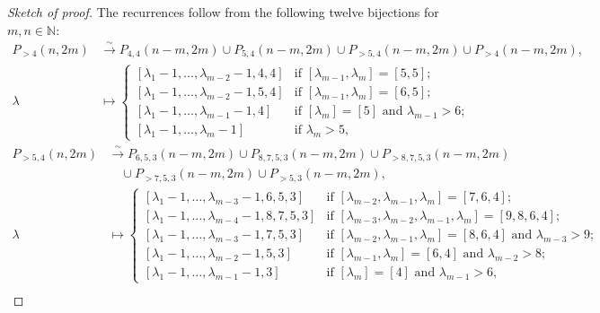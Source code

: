 \documentclass[a4paper, 12pt, reqno]{amsart}
\theoremstyle{remark}
\numberwithin{equation}{subsection}
\begin{document}
\begin{proof}[Sketch of proof]
  The recurrences follow from the following twelve bijections for $m, n \in \mathbb{N}$:
  \begin{align*}
    P_{>4}(n, 2m) &\xrightarrow{\sim} P_{4, 4}(n - m, 2m) \cup P_{5, 4}(n - m, 2m) \cup P_{>5, 4}(n - m, 2m) \cup P_{>4}(n - m, 2m), \\
    \lambda &\mapsto
              \begin{cases}
                [\lambda_1 - 1, \dots, \lambda_{m - 2} - 1, 4, 4] &\text{if }[\lambda_{m - 1}, \lambda_m] = [5, 5]; \\
                [\lambda_1 - 1, \dots, \lambda_{m - 2} - 1, 5, 4] &\text{if }[\lambda_{m - 1}, \lambda_m] = [6, 5]; \\
                [\lambda_1 - 1, \dots, \lambda_{m - 1} - 1, 4] &\text{if }[\lambda_m] = [5]\text{ and }\lambda_{m - 1} > 6; \\
                [\lambda_1 - 1, \dots, \lambda_m - 1] &\text{if }\lambda_m > 5,
              \end{cases}
  \end{align*}
  \begin{align*}
    P_{>5, 4}(n, 2m) &\xrightarrow{\sim} P_{6, 5, 3}(n - m, 2m) \cup P_{8, 7, 5, 3}(n - m, 2m) \cup P_{>8, 7, 5, 3}(n - m, 2m) \\
    &\quad \cup P_{>7, 5, 3}(n - m, 2m) \cup P_{>5, 3}(n - m, 2m), \\
    \lambda &\mapsto
              \begin{cases}
                [\lambda_1 - 1, \dots, \lambda_{m - 3} - 1, 6, 5, 3] &\text{if }[\lambda_{m - 2}, \lambda_{m - 1}, \lambda_m] = [7, 6, 4]; \\
                [\lambda_1 - 1, \dots, \lambda_{m - 4} - 1, 8, 7, 5, 3] &\text{if }[\lambda_{m - 3}, \lambda_{m - 2}, \lambda_{m - 1}, \lambda_m] = [9, 8, 6, 4]; \\
                [\lambda_1 - 1, \dots, \lambda_{m - 3} - 1, 7, 5, 3] &\text{if }[\lambda_{m - 2}, \lambda_{m - 1}, \lambda_m] = [8, 6, 4]\text{ and }\lambda_{m - 3} > 9; \\
                [\lambda_1 - 1, \dots, \lambda_{m - 2} - 1, 5, 3] &\text{if }[\lambda_{m - 1}, \lambda_m] = [6, 4]\text{ and }\lambda_{m - 2} > 8; \\
                [\lambda_1 - 1, \dots, \lambda_{m - 1} - 1, 3] &\text{if }[\lambda_m] = [4]\text{ and }\lambda_{m - 1} > 6,
              \end{cases}
  \end{align*}
  \begin{align*}

\end{align*}
\end{proof}
\end{document}
